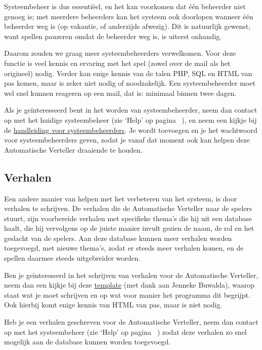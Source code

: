 \documentclass[12pt]{article}
\begin{document}
  Systeembeheer is dus essenti\"eel, en het kan voorkomen dat \'e\'en beheerder niet genoeg is; met meerdere beheerders kan het systeem ook doorlopen wanneer \'e\'en beheerder weg is (op vakantie, of anderzijds afwezig). Dit is natuurlijk gewenst, want spellen pauzeren omdat de beheerder weg is, is uiterst onhandig.  
  
  Daarom zouden we graag meer systeembeheerders verwelkomen. Voor deze functie is veel kennis en ervaring met het spel (zowel over de mail als het origineel) nodig. Verder kan enige kennis van de talen PHP, SQL en HTML van pas komen, maar is zeker niet nodig of noodzakelijk. Een systeembeheerder moet wel snel kunnen reageren op een mail, dat is: minimaal binnen twee dagen.
  
  Als je ge\"interesseerd bent in het worden van systeembeheerder, neem dan contact op met het huidige systeembeheer (zie `Help' op pagina~\pageref{subsec:help} ), en neem een kijkje bij de \href{http://www.liacs.nl/~vdekker/WW/pdf/manAdmin.pdf}{handleiding voor systeembeheerders}. Je wordt toevoegen en je het wachtwoord voor systeembeheerders geven, zodat je vanaf dat moment ook kan helpen deze Automatische Verteller draaiende te houden.

  \subsection{Verhalen} \label{subsec:verhalen}
  
  Een andere manier van helpen met het verbeteren van het systeem, is door verhalen te schrijven. De verhalen die de Automatische Verteller naar de spelers stuurt, zijn voorbereide verhalen met specifieke thema's die hij uit een database haalt, die hij vervolgens op de juiste manier invult gezien de naam, de rol en het geslacht van de spelers. Aan deze database kunnen meer verhalen worden toegevoegd, met nieuwe thema's, zodat er steeds meer verhalen komen, en de spellen daarmee steeds uitgebreider worden.
  
  Ben je ge\"interesserd in het schrijven van verhalen voor de Automatische Verteller, neem dan een kijkje bij deze \href{http://placeholder-voor-jennekes-template}{template} (met dank aan Jenneke Buwalda), waarop staat wat je moet schrijven en op wat voor manier het programma dit begrijpt. Ook hierbij komt enige kennis van HTML van pas, maar is niet nodig.
  
  Heb je een verhalen geschreven voor de Automatische Verteller, neem dan contact op met het systeembeheer (zie `Help' op pagina~\pageref{subsec:help} ) zodat deze verhalen zo snel mogelijk aan de database kunnen worden toegevoegd.
  
\end{document}
